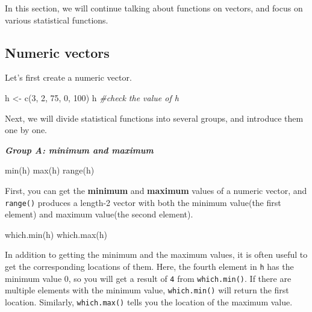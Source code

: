 \documentclass[
]{book}
\newenvironment{Shaded}{\begin{snugshade}}{\end{snugshade}}
\newcommand{\CommentTok}[1]{\textcolor[rgb]{0.56,0.35,0.01}{\textit{#1}}}
\newcommand{\DecValTok}[1]{\textcolor[rgb]{0.00,0.00,0.81}{#1}}
\newcommand{\FunctionTok}[1]{\textcolor[rgb]{0.00,0.00,0.00}{#1}}
\newcommand{\NormalTok}[1]{#1}
\newcommand{\OtherTok}[1]{\textcolor[rgb]{0.56,0.35,0.01}{#1}}
\begin{document}
In this section, we will continue talking about functions on vectors, and focus on various statistical functions.

\hypertarget{numeric-vectors-1}{%
\subsection{Numeric vectors}\label{numeric-vectors-1}}

Let's first create a numeric vector.

\begin{Shaded}
\begin{Highlighting}[]
\NormalTok{h }\OtherTok{\textless{}{-}} \FunctionTok{c}\NormalTok{(}\DecValTok{3}\NormalTok{, }\DecValTok{2}\NormalTok{, }\DecValTok{75}\NormalTok{, }\DecValTok{0}\NormalTok{, }\DecValTok{100}\NormalTok{)}
\NormalTok{h }\CommentTok{\#check the value of h}
\end{Highlighting}
\end{Shaded}

Next, we will divide statistical functions into several groups, and introduce them one by one.

\textbf{\emph{Group A: minimum and maximum}}

\begin{Shaded}
\begin{Highlighting}[]
\FunctionTok{min}\NormalTok{(h) }
\FunctionTok{max}\NormalTok{(h) }
\FunctionTok{range}\NormalTok{(h)}
\end{Highlighting}
\end{Shaded}

First, you can get the \textbf{minimum} and \textbf{maximum} values of a numeric vector, and \texttt{range()} produces a length-2 vector with both the minimum value(the first element) and maximum value(the second element).

\begin{Shaded}
\begin{Highlighting}[]
\FunctionTok{which.min}\NormalTok{(h) }
\FunctionTok{which.max}\NormalTok{(h) }
\end{Highlighting}
\end{Shaded}

In addition to getting the minimum and the maximum values, it is often useful to get the corresponding locations of them. Here, the fourth element in \texttt{h} has the minimum value 0, so you will get a result of \texttt{4} from \texttt{which.min()}. If there are multiple elements with the minimum value, \texttt{which.min()} will return the first location. Similarly, \texttt{which.max()} tells you the location of the maximum value.
\end{document}
